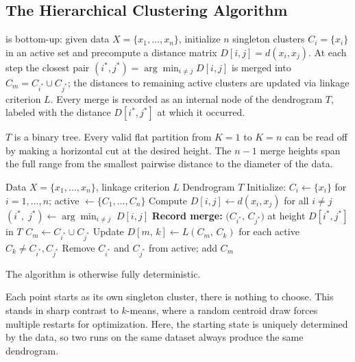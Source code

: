 \newpage

\subsection{The Hierarchical Clustering Algorithm}

\cite{Ward1963} is bottom-up: given data $X = \{x_1,\ldots,x_n\}$, initialize $n$ singleton clusters $C_i = \{x_i\}$ in an active set and precompute a distance matrix $D[i,j] = d(x_i, x_j)$.
At each step the closest pair $(i^*,j^*) = \arg\min_{i \neq j} D[i,j]$ is merged into $C_m = C_{i^*} \cup C_{j^*}$; the distances to remaining active clusters are updated via linkage criterion $L$.
Every merge is recorded as an internal node of the dendrogram $T$, labeled with the distance $D[i^*,j^*]$ at which it occurred.

 $T$ is a binary tree.
Every valid flat partition from $K{=}1$ to $K{=}n$ can be read off by making a horizontal cut at the desired height.
The $n-1$ merge heights span the full range from the smallest pairwise distance to the diameter of the data.

\vspace{2.5em}
\begin{algorithm}[H]
\caption{Agglomerative Hierarchical Clustering. }
\begin{algorithmic}[1]
\Require Data $X = \{x_1, \ldots, x_n\}$, linkage criterion $L$
\Ensure Dendrogram $T$
\State Initialize: $C_i \gets \{x_i\}$ for $i = 1,\ldots,n$; active $\gets \{C_1,\ldots,C_n\}$
\State Compute $D[i,j] \gets d(x_i, x_j)$ for all $i \neq j$
    \State $(i^*,\;j^*) \gets \arg\min_{i \neq j}\; D[i,j]$
    \State \textbf{Record merge:} $\bigl(C_{i^*},\, C_{j^*}\bigr)$ at height $D[i^*,j^*]$ in $T$
    \State $C_m \gets C_{i^*} \cup C_{j^*}$
    \State Update $D[m,\,k] \gets L(C_m,\,C_k)$ for each active $C_k \neq C_{i^*},C_{j^*}$
    \State Remove $C_{i^*}$ and $C_{j^*}$ from active; add $C_m$
\EndWhile
\end{algorithmic}
\end{algorithm}

The algorithm is otherwise fully deterministic.

 Each point starts as its own singleton cluster,
there is nothing to choose. This stands in sharp contrast to $k$-means,
where a random centroid draw forces multiple restarts for optimization. Here, the starting state
is uniquely determined by the data, so two runs on the same dataset always produce the same
dendrogram.


